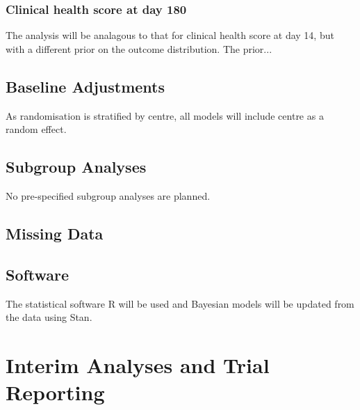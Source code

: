 \documentclass[11pt,parskip=full-]{scrartcl}
\begin{document}
\subsubsection{Clinical health score at day 180}
The analysis will be analagous to that for clinical health score at day 14, but with a different prior on the outcome distribution. The prior...

\subsection{Baseline Adjustments}
As randomisation is stratified by centre, all models will include centre as a random effect.

\subsection{Subgroup Analyses}
No pre-specified subgroup analyses are planned.

\subsection{Missing Data}


\subsection{Software}
The statistical software R will be used and Bayesian models will be updated from the data using Stan.

\clearpage

\section{Interim Analyses and Trial Reporting}
\end{document}
